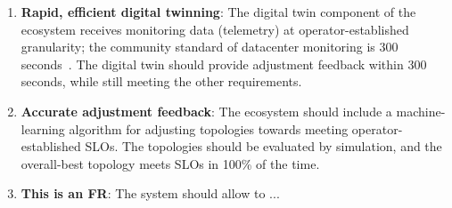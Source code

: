\begin{enumerate}[label=\textbf{(NFR\arabic*)},leftmargin=0pt,itemindent=3em]
    \item \label{design:nfr1} \textbf{Rapid, efficient digital twinning}: The digital twin component of the ecosystem receives monitoring data (telemetry) at operator-established granularity; the community standard of datacenter monitoring is 300 seconds~\cite{DBLP:conf/ccgrid/MastenbroekAJLB21, nicolae5377101m3sa, DBLP:journals/fgcs/MastenbroekMBI25}. 
    The digital twin should provide adjustment feedback within 300 seconds, while still meeting the other requirements.
    
    \item \label{design:nfr2} \textbf{Accurate adjustment feedback}: The ecosystem should include a machine-learning algorithm for adjusting topologies towards meeting operator-established SLOs. The topologies should be evaluated by simulation, and the overall-best topology meets SLOs in 100\% of the time. 
    \item \label{design:nfr3} \textbf{This is an FR}: The system should allow to ...
\end{enumerate}



